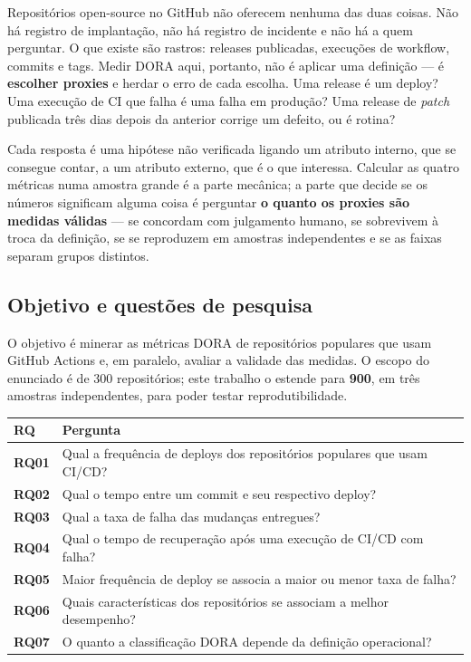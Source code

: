 \documentclass[12pt]{article}
\begin{document}
Repositórios open-source no GitHub não oferecem nenhuma das duas coisas. Não há registro de implantação, não há registro de incidente e não há a quem perguntar. O que existe são rastros: releases publicadas, execuções de workflow, commits e tags. Medir DORA aqui, portanto, não é aplicar uma definição — é \textbf{escolher proxies} e herdar o erro de cada escolha. Uma release é um deploy? Uma execução de CI que falha é uma falha em produção? Uma release de \emph{patch} publicada três dias depois da anterior corrige um defeito, ou é rotina?

Cada resposta é uma hipótese não verificada ligando um atributo interno, que se consegue contar, a um atributo externo, que é o que interessa. Calcular as quatro métricas numa amostra grande é a parte mecânica; a parte que decide se os números significam alguma coisa é perguntar \textbf{o quanto os proxies são medidas válidas} — se concordam com julgamento humano, se sobrevivem à troca da definição, se se reproduzem em amostras independentes e se as faixas separam grupos distintos.

\subsection{Objetivo e questões de pesquisa}

O objetivo é minerar as métricas DORA de repositórios populares que usam GitHub Actions e, em paralelo, avaliar a validade das medidas. O escopo do enunciado é de 300 repositórios; este trabalho o estende para \textbf{900}, em três amostras independentes, para poder testar reprodutibilidade.

\begin{table}[!htbp]
\centering
\scriptsize
\begin{tabular}{p{}p{}}
\toprule
\textbf{RQ} & \textbf{Pergunta} \\
\midrule
\textbf{RQ01} & Qual a frequência de deploys dos repositórios populares que usam CI/CD? \\
\textbf{RQ02} & Qual o tempo entre um commit e seu respectivo deploy? \\
\textbf{RQ03} & Qual a taxa de falha das mudanças entregues? \\
\textbf{RQ04} & Qual o tempo de recuperação após uma execução de CI/CD com falha? \\
\textbf{RQ05} & Maior frequência de deploy se associa a maior ou menor taxa de falha? \\
\textbf{RQ06} & Quais características dos repositórios se associam a melhor desempenho? \\
\textbf{RQ07} & O quanto a classificação DORA depende da definição operacional? \\
\bottomrule
\end{tabular}
\end{table}
\end{document}
